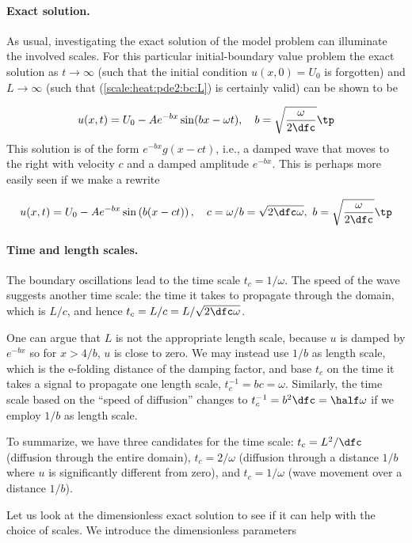 \documentclass[graybox,envcountchap,sectrefs,final]{svmonodo}
\begin{document}
\paragraph{Exact solution.}
As usual, investigating the exact solution of the model problem can
illuminate the involved scales. For this particular initial-boundary
value problem the exact solution as $t\rightarrow\infty$
(such that
the initial condition $u(x,0)=U_0$ is forgotten)
and $L\rightarrow\infty$ (such that (\ref{scale:heat:pde2:bc:L})
is certainly valid) can be shown to be

\begin{equation}
u(x,t) = U_0 - Ae^{-bx}\sin (bx - \omega t),\quad b =\sqrt{\frac{\omega}{2\dfc}}\tp
\label{scale:heat:daynight:sol}
\end{equation}
This solution is of the form $e^{-bx}g(x-ct)$, i.e., a damped wave that
moves to the right with velocity $c$ and a damped amplitude $e^{-bx}$.
This is perhaps more easily seen if we make a rewrite

\[ u(x,t) = U_0 - Ae^{-bx}\sin\left(b(x - ct)\right),\quad
c=\omega/b = \sqrt{2\dfc\omega},\  b =\sqrt{\frac{\omega}{2\dfc}}\tp\]

\paragraph{Time and length scales.}
The boundary oscillations lead to the time scale $t_c=1/\omega$.
The speed of the wave suggests another time scale: the time it
takes to propagate through the domain, which is $L/c$, and
hence $t_c = L/c = L/\sqrt{2\dfc\omega}$.

One can argue that $L$ is not the appropriate length scale, because
$u$ is damped by $e^{-bx}$ so for $x > 4/b$, $u$ is close to zero.
We may instead use $1/b$ as length scale, which is the e-folding distance of the
damping factor, and base
$t_c$ on the time it takes a signal to propagate one length scale,
$t_c^{-1}=bc=\omega$. Similarly, the time scale based on
the ``speed of diffusion'' changes to
$t_c^{-1}= b^2\dfc = \half\omega$ if we employ $1/b$ as length scale.

To summarize, we have three candidates for the time scale:
$t_c=L^2/\dfc$ (diffusion through the entire domain), $t_c=2/\omega$
(diffusion through a distance $1/b$ where $u$ is significantly
different from zero), and $t_c=1/\omega$ (wave movement over a
distance $1/b$).

Let us look at the dimensionless exact solution to see if it can help
with the choice of scales.  We introduce the dimensionless parameters
\end{document}

